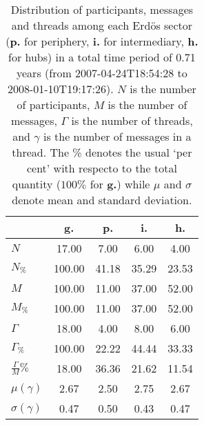 \begin{table}[h!]
\begin{center}
\begin{tabular}{| l || c | c | c | c |}\hline
 & {\bf g.} & {\bf p.} & {\bf i.} & {\bf h.} \\\hline\hline
$N$ & 17.00  & 7.00  & 6.00  & 4.00 \\
$N_{\%}$ & 100.00  & 41.18  & 35.29  & 23.53 \\\hline
$M$ & 100.00  & 11.00  & 37.00  & 52.00 \\
$M_{\%}$ & 100.00  & 11.00  & 37.00  & 52.00 \\\hline
$\Gamma$ & 18.00  & 4.00  & 8.00  & 6.00 \\
$\Gamma_{\%}$ & 100.00  & 22.22  & 44.44  & 33.33 \\\hline
$\frac{\Gamma}{M}\%$ & 18.00  & 36.36  & 21.62  & 11.54 \\
$\mu(\gamma)$ & 2.67  & 2.50  & 2.75  & 2.67 \\
$\sigma(\gamma)$ & 0.47  & 0.50  & 0.43  & 0.47 \\\hline
\end{tabular}
\caption{Distribution of participants, messages and threads among each Erd\"os sector ({\bf p.} for periphery, {\bf i.} for intermediary, 
    {\bf h.} for hubs) in a total time period of 0.71 years (from 2007-04-24T18:54:28 to 2008-01-10T19:17:26). $N$ is the number of participants, $M$ is the number of messages, $\Gamma$ is the number of threads, and $\gamma$ is the number of messages in a thread.
    The \% denotes the usual `per cent' with respecto to the total quantity ($100\%$ for {\bf g.})
    while $\mu$ and $\sigma$ denote mean and standard deviation.}
\end{center}
\end{table}